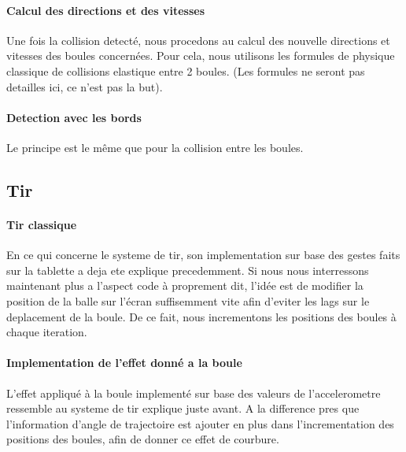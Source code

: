 \paragraph{Calcul des directions et des vitesses}

Une fois la collision detecté, nous procedons au calcul des nouvelle directions et vitesses des boules concernées. Pour cela, nous utilisons les formules de physique classique de collisions elastique entre 2 boules. (Les formules ne seront pas detailles ici, ce n'est pas la but).

\paragraph{Detection avec les bords} 

Le principe est le même que pour la collision entre les boules.	
	
	\subsection{Tir}	
\paragraph{Tir classique}

En ce qui concerne le systeme de tir, son implementation sur base des gestes faits sur la tablette a deja ete explique precedemment. Si nous nous interressons maintenant plus a l'aspect code à proprement dit, l'idée est de modifier la position de la balle sur l'écran suffisemment vite afin d'eviter les lags sur le deplacement de la boule. De ce fait, nous incrementons les positions des boules à chaque iteration. 

\paragraph{Implementation de l'effet donné a la boule}

L'effet appliqué à la boule implementé sur base des valeurs de l'accelerometre ressemble au systeme de tir explique juste avant. A la difference pres que l'information d'angle de trajectoire est ajouter en plus dans l'incrementation des positions des boules, afin de donner ce effet de courbure.
	

